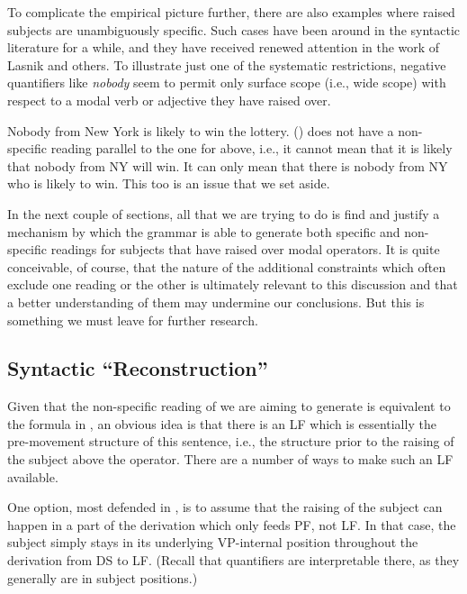 To complicate the empirical picture further, there are also examples where
raised subjects are unambiguously specific. Such cases have been around in the
syntactic literature for a while, and they have received renewed attention in
the work of Lasnik and others. To illustrate just one of the systematic
restrictions, negative quantifiers like \emph{nobody} seem to permit only
surface scope (i.e., wide scope) with respect to a modal verb or adjective they
have raised over.

\ex Nobody from New York is likely to win the lottery. \xe
%
(\lastx) does not have a non-specific reading parallel to the one for
 above, i.e., it cannot mean that it is likely that nobody from NY
will win. It can only mean that there is nobody from NY who is likely to win.
This too is an issue that we set aside.

In the next couple of sections, all that we are trying to do is find and justify
a mechanism by which the grammar is able to generate both specific and
non-specific readings for subjects that have raised over modal operators. It is
quite conceivable, of course, that the nature of the additional constraints
which often exclude one reading or the other is ultimately relevant to this
discussion and that a better understanding of them may undermine our
conclusions. But this is something we must leave for further research.

\subsection{Syntactic ``Reconstruction''}

Given that the non-specific reading of  we are aiming to generate is
equivalent to the formula in , an obvious idea is that there is an
LF which is essentially the pre-movement structure of this sentence, i.e., the
structure prior to the raising of the subject above the operator. There are a
number of ways to make such an LF available.

One option, most defended in \citet{sauerland-elbourne:2002:total}, is to assume
that the raising of the subject can happen in a part of the derivation which
only feeds PF, not LF. In that case, the subject simply stays in its underlying
VP-internal position throughout the derivation from DS to LF. (Recall that
quantifiers are interpretable there, as they generally are in subject
positions.)

